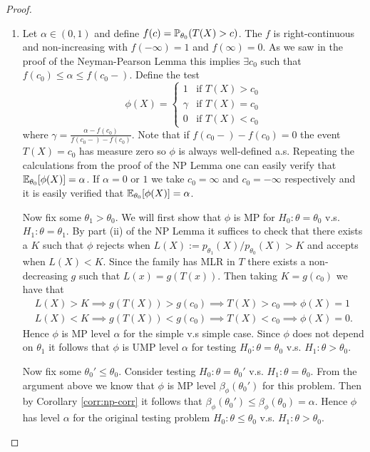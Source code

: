 \begin{proof}
	\phantom{ }
	\begin{enumerate}
		\item[(i)] Let $\alpha \in (0,1)$ and define $f(c) = \mathbb{P}_{\theta_0}(T(X) > c)$. The $f$ is right-continuous and non-increasing with $f(-\infty) = 1$ and $f(\infty) = 0$. As we saw in the proof of the Neyman-Pearson Lemma this implies $\exists c_0$ such that $f(c_0) \leq \alpha  \leq f(c_{0}-)$. Define the test \[
		 \phi(X) = \begin{cases}
			1 &\text{if } T(X) > c_0 \\
			\gamma &\text{if } T(X) = c_0 \\
			0 &\text{if } T(X) < c_0
		\end{cases}
		\] where $\gamma = \frac{\alpha - f(c_0)}{f(c_0-) - f(c_0)}$.  Note that if $f(c_0-) - f(c_0) = 0$ the event $T(X) = c_0$ has measure zero so $\phi$ is always well-defined a.s. Repeating the calculations from the proof of the NP Lemma one can easily verify that $\mathbb{E}_{\theta_0}[\phi(X)] = \alpha$. If $\alpha = 0$ or $1$ we take $c_0 = \infty$ and $c_0 = -\infty$ respectively and it is easily verified that $\mathbb{E}_{\theta_0}[\phi(X)] = \alpha$.
		
		Now fix some $\theta_1 > \theta_0$.  We will first show that $\phi$ is MP for $H_0 : \theta = \theta_0$ v.s. $H_1 : \theta = \theta_1$. By part (ii) of the NP Lemma it suffices to check that there exists a $K$ such that $\phi$ rejects when $L(X) := p_{\theta_1}(X) / p_{\theta_0}(X) > K$ and accepts when $L(X) < K$. Since the family has MLR in $T$ there exists a non-decreasing $g$ such that $L(x) = g(T(x))$. Then taking $K = g(c_0)$ we have that \begin{align*}
			L(X) > K \implies g(T(X)) > g(c_0) \implies T(X) > c_0 \implies \phi(X) = 1\phantom{.} \\
			L(X) < K \implies g(T(X)) < g(c_0) \implies T(X) < c_0 \implies \phi(X) = 0.
		\end{align*}
		Hence $\phi$ is MP level $\alpha$ for the simple v.s simple case. Since $\phi$ does not depend on $\theta_1$ it follows that $\phi$ is UMP level $\alpha$ for testing $H_0 : \theta = \theta_0$ v.s. $H_1 : \theta > \theta_0$.
		
		Now fix some $\theta_0' \leq \theta_0$. Consider testing $H_0 : \theta = \theta_0'$ v.s. $H_1 : \theta = \theta_0$. From the argument above we know that $\phi$ is MP level $\beta_\phi(\theta_0')$ for this problem. Then by Corollary \ref{corr:np-corr} it follows that $\beta_\phi(\theta_0') \le \beta_\phi(\theta_0) = \alpha$. Hence $\phi$ has level $\alpha$ for the original testing problem $H_0 : \theta \le \theta_0$ v.s. $H_1 : \theta > \theta_0$. 
		

\end{enumerate}
\end{proof}
